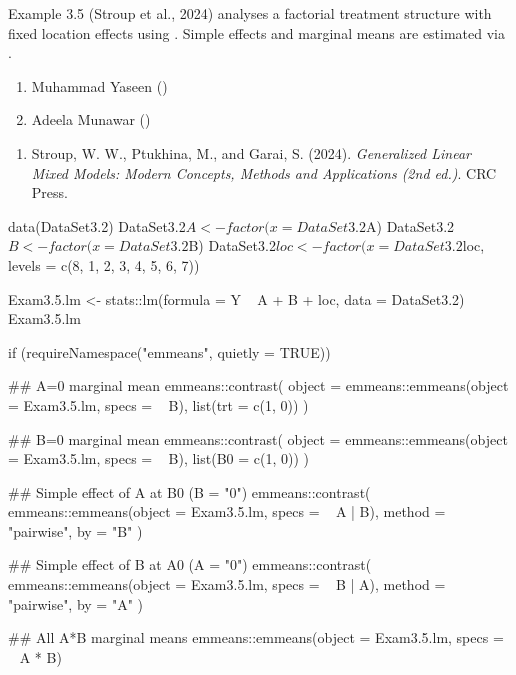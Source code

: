 \documentclass[a4paper]{book}
\begin{document}
%
\begin{Description}
Example 3.5 (Stroup et al., 2024) analyses a factorial treatment
structure with fixed location effects using .
Simple effects and marginal means are estimated via .
\end{Description}
%
\begin{Author}
\begin{enumerate}

\item{} Muhammad Yaseen ()
\item{} Adeela Munawar ()

\end{enumerate}

\end{Author}
%
\begin{References}
\begin{enumerate}

\item{} Stroup, W. W., Ptukhina, M., and Garai, S. (2024).
\emph{Generalized Linear Mixed Models: Modern Concepts, Methods and Applications (2nd ed.)}.
CRC Press.

\end{enumerate}

\end{References}
%
\begin{SeeAlso}
\end{SeeAlso}
%
\begin{Examples}
\begin{ExampleCode}
data(DataSet3.2)
DataSet3.2$A   <- factor(x = DataSet3.2$A)
DataSet3.2$B   <- factor(x = DataSet3.2$B)
DataSet3.2$loc <- factor(x = DataSet3.2$loc, levels = c(8, 1, 2, 3, 4, 5, 6, 7))

Exam3.5.lm <- stats::lm(formula = Y ~ A + B + loc, data = DataSet3.2)
Exam3.5.lm

if (requireNamespace("emmeans", quietly = TRUE)) {
  ## A=0 marginal mean
  emmeans::contrast(
    object = emmeans::emmeans(object = Exam3.5.lm, specs = ~ B),
    list(trt = c(1, 0))
  )

  ## B=0 marginal mean
  emmeans::contrast(
    object = emmeans::emmeans(object = Exam3.5.lm, specs = ~ B),
    list(B0 = c(1, 0))
  )

  ## Simple effect of A at B0 (B = "0")
  emmeans::contrast(
    emmeans::emmeans(object = Exam3.5.lm, specs = ~ A | B),
    method = "pairwise",
    by     = "B"
  )

  ## Simple effect of B at A0 (A = "0")
  emmeans::contrast(
    emmeans::emmeans(object = Exam3.5.lm, specs = ~ B | A),
    method = "pairwise",
    by     = "A"
  )

  ## All A*B marginal means
  emmeans::emmeans(object = Exam3.5.lm, specs = ~ A * B)
}
\end{ExampleCode}
\end{Examples}
\end{document}
